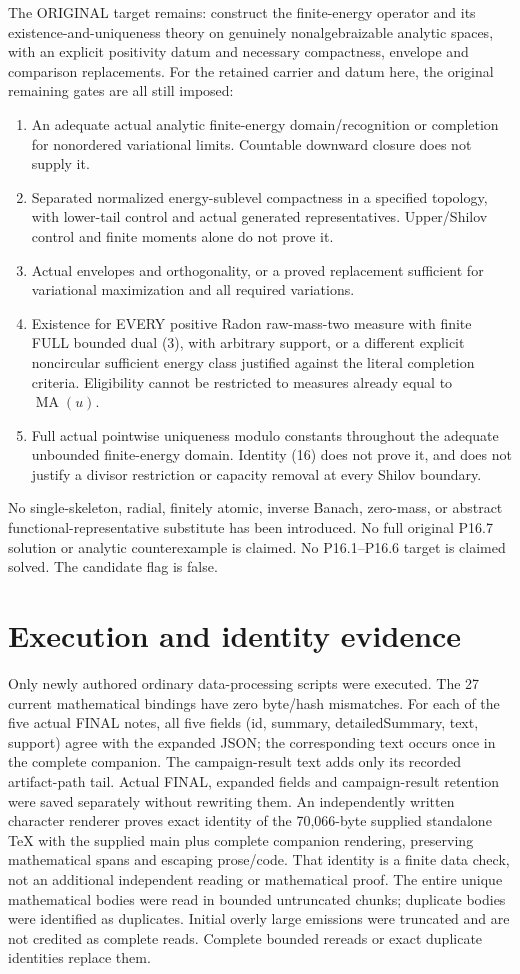 \documentclass[11pt]{article}
\newcommand{\MA}{\operatorname{MA}}
\begin{document}
The ORIGINAL target remains: construct the finite-energy operator and its
existence-and-uniqueness theory on genuinely nonalgebraizable analytic spaces,
with an explicit positivity datum and necessary compactness, envelope and
comparison replacements. For the retained carrier and datum here, the original
remaining gates are all still imposed:
\begin{enumerate}
\item An adequate actual analytic finite-energy domain/recognition or completion
for nonordered variational limits. Countable downward closure does not supply it.
\item Separated normalized energy-sublevel compactness in a specified topology,
with lower-tail control and actual generated representatives. Upper/Shilov
control and finite moments alone do not prove it.
\item Actual envelopes and orthogonality, or a proved replacement sufficient
for variational maximization and all required variations.
\item Existence for EVERY positive Radon raw-mass-two measure with finite FULL
bounded dual (3), with arbitrary support, or a different explicit noncircular
sufficient energy class justified against the literal completion criteria.
Eligibility cannot be restricted to measures already equal to $\MA(u)$.
\item Full actual pointwise uniqueness modulo constants throughout the adequate
unbounded finite-energy domain. Identity (16) does not prove it, and does not
justify a divisor restriction or capacity removal at every Shilov boundary.
\end{enumerate}
No single-skeleton, radial, finitely atomic, inverse Banach, zero-mass, or
abstract functional-representative substitute has been introduced.
No full original P16.7 solution or analytic counterexample is claimed.
No P16.1--P16.6 target is claimed solved. The candidate flag is false.

\section{Execution and identity evidence}
Only newly authored ordinary data-processing scripts were executed.
The 27 current mathematical bindings have zero byte/hash mismatches.
For each of the five actual FINAL notes, all five fields (id, summary,
detailedSummary, text, support) agree with the expanded JSON; the corresponding
text occurs once in the complete companion. The campaign-result text adds
only its recorded artifact-path tail. Actual FINAL, expanded fields and
campaign-result retention were saved separately without rewriting them.
An independently written character renderer proves exact identity of the
70,066-byte supplied standalone TeX with the supplied main plus complete
companion rendering, preserving mathematical spans and escaping prose/code.
That identity is a finite data check, not an additional independent reading
or mathematical proof. The entire unique mathematical bodies were read in
bounded untruncated chunks; duplicate bodies were identified as duplicates.
Initial overly large emissions were truncated and are not credited as complete
reads. Complete bounded rereads or exact duplicate identities replace them.
\end{document}
